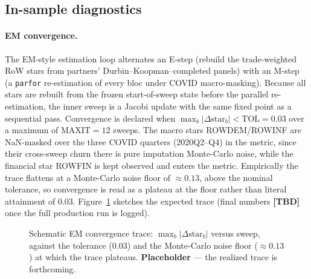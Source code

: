 \documentclass[11pt]{article}
\theoremstyle{definition}
\theoremstyle{remark}
\begin{document}
\subsection{In-sample diagnostics}\label{sec:empirical:insample}

\paragraph{EM convergence.} The EM-style estimation loop alternates an E-step (rebuild the trade-weighted RoW stars from partners' Durbin--Koopman--completed panels) with an M-step (a \texttt{parfor} re-estimation of every bloc under COVID macro-masking). Because all stars are rebuilt from the frozen start-of-sweep state before the parallel re-estimation, the inner sweep is a Jacobi update with the same fixed point as a sequential pass. Convergence is declared when $\max_b|\Delta\mathrm{star}_b| < \mathrm{TOL}=0.03$ over a maximum of $\mathrm{MAXIT}=12$ sweeps. The macro stars ROWDEM/ROWINF are NaN-masked over the three COVID quarters (2020Q2--Q4) in the metric, since their cross-sweep churn there is pure imputation Monte-Carlo noise, while the financial star ROWFIN is kept observed and enters the metric. Empirically the trace flattens at a Monte-Carlo noise floor of $\approx 0.13$, above the nominal tolerance, so convergence is read as a plateau at the floor rather than literal attainment of $0.03$. Figure~\ref{fig:empirical:emtrace} sketches the expected trace (final numbers \textbf{[TBD]} once the full production run is logged).

\begin{figure}[!ht]
\centering
{}
\caption{Schematic EM convergence trace: $\max_b|\Delta\mathrm{star}_b|$ versus sweep, against the tolerance ($0.03$) and the Monte-Carlo noise floor ($\approx 0.13$) at which the trace plateaus. \textbf{Placeholder} --- the realized trace is forthcoming.}
\label{fig:empirical:emtrace}
\end{figure}
\end{document}
